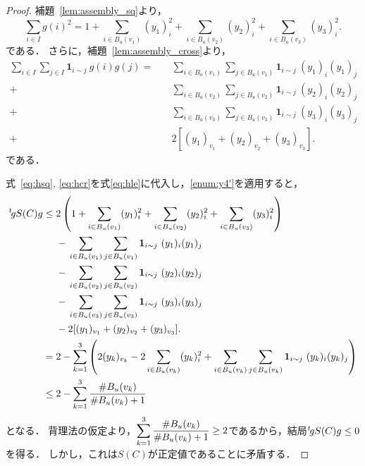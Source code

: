 \begin{proof}
  補題~\ref{lem:assembly_sq}より，
  \begin{equation} \label{eq:hsq}
    \sum_{i \in I} g(i) ^ 2
    = 1 + \sum_{i \in B_u(v_1)} (y_1)_i ^ 2 + \sum_{i \in B_u(v_2)} (y_2)_i ^ 2 + \sum_{i \in B_u(v_3)} (y_3)_i ^ 2.
  \end{equation}
  である．
  さらに，補題~\ref{lem:assembly_cross}より，
  \begin{equation} \label{eq:hcr}
    \begin{split}
      \sum_{i \in I} \sum_{j \in I} \bm{1}_{i \sim j}\ g(i) g(j)
    {}={}\quad &\sum_{i \in B_u(v_1)} \sum_{j \in B_u(v_1)} \bm{1}_{i \sim j}\ (y_1)_i (y_1)_j \\
    {}+{} &\sum_{i \in B_u(v_2)} \sum_{j \in B_u(v_2)} \bm{1}_{i \sim j}\ (y_2)_i (y_2)_j \\
    {}+{} &\sum_{i \in B_u(v_3)} \sum_{j \in B_u(v_3)} \bm{1}_{i \sim j}\ (y_3)_i (y_3)_j \\
    {}+{} & 2 [(y_1)_{v_1} + (y_2)_{v_2} + (y_3)_{v_3}].
    \end{split}
  \end{equation}
  である．

  式~\eqref{eq:hsq}, \eqref{eq:hcr}を式\eqref{eq:hle}に代入し，\ref{enum:y4'}を適用すると，
  \begin{equation}
    \begin{split}
      {}^t\!g S(C) g
    {}\le{} &2 \left( 1 + \sum_{i \in B_u(v_1)} (y_1)_i ^ 2 + \sum_{i \in B_u(v_2)} (y_2)_i ^ 2 + \sum_{i \in B_u(v_3)} (y_3)_i ^ 2 \right) \\
    &{}-{} \sum_{i \in B_u(v_1)} \sum_{j \in B_u(v_1)} \bm{1}_{i \sim j}\ (y_1)_i (y_1)_j \\
    &{}-{} \sum_{i \in B_u(v_2)} \sum_{j \in B_u(v_2)} \bm{1}_{i \sim j}\ (y_2)_i (y_2)_j \\
    &{}-{} \sum_{i \in B_u(v_3)} \sum_{j \in B_u(v_3)} \bm{1}_{i \sim j}\ (y_3)_i (y_3)_j \\
    &{}-{}  2 [(y_1)_{v_1} + (y_2)_{v_2} + (y_3)_{v_3}]. \\
    {}={}& 2 - \sum_{k = 1}^3 \left( 2 (y_k)_{v_k} - 2 \sum_{i \in B_u(v_k)} (y_k)_i ^ 2 + \sum_{i \in B_u(v_k)} \sum_{j \in B_u(v_k)} \bm{1}_{i \sim j}\ (y_k)_i (y_k)_j \right) \\
    {}\le{}& 2 - \sum_{k = 1}^3 \frac{\# B_u(v_k)}{\# B_u(v_k) + 1}
    \end{split}
  \end{equation}
  となる．
  背理法の仮定より，$\displaystyle \sum_{k = 1}^3 \frac{\# B_u(v_k)}{\# B_u(v_k) + 1} \ge 2$であるから，結局${}^t\!g S(C) g \le 0$を得る．
  しかし，これは$S(C)$が正定値であることに矛盾する．
\end{proof}


